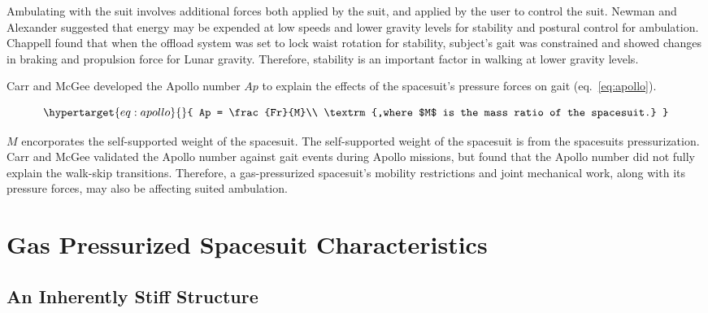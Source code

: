 \documentclass[defaultstyle,11pt]{comps}
\begin{document}
Ambulating with the suit involves additional forces both applied by the suit, and applied by the user to control the suit.
Newman and Alexander \citep{Newman1993} suggested that energy may be expended at low speeds and lower gravity levels for stability and postural control for ambulation.
Chappell \citep{Chappell2006} found that when the offload system was set to lock waist rotation for stability, subject's gait was constrained and showed changes in braking and propulsion force for Lunar gravity.
Therefore, stability is an important factor in walking at lower gravity levels.

Carr and McGee \citep{Carr2009} developed the Apollo number \(Ap\) to explain the effects of the spacesuit's pressure forces on gait (eq.~\ref{eq:apollo}).

\begin{equation}\protect\hypertarget{eq:apollo}{}{
Ap = \frac{Fr}{M}\\
\textrm{,where $M$ is the mass ratio of the spacesuit.}
}\label{eq:apollo}\end{equation}

\(M\) encorporates the self-supported weight of the spacesuit.
The self-supported weight of the spacesuit is from the spacesuits pressurization.
Carr and McGee validated the Apollo number against gait events during Apollo missions, but found that the Apollo number did not fully explain the walk-skip transitions.
Therefore, a gas-pressurized spacesuit's mobility restrictions and joint mechanical work, along with its pressure forces, may also be affecting suited ambulation.

\hypertarget{gas-pressurized-spacesuit-characteristics}{%
\section{Gas Pressurized Spacesuit Characteristics}\label{gas-pressurized-spacesuit-characteristics}}

\hypertarget{an-inherently-stiff-structure}{%
\subsection{An Inherently Stiff Structure}\label{an-inherently-stiff-structure}}
\end{document}
